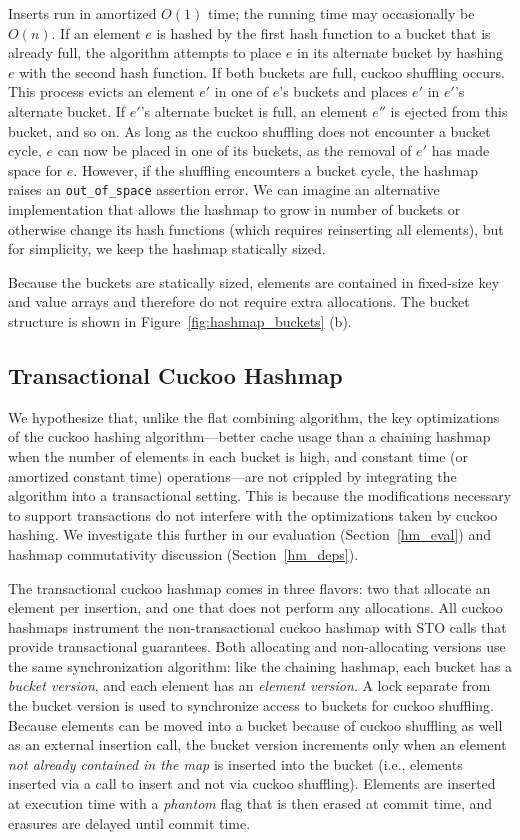 Inserts run in amortized $O(1)$ time; the running time may occasionally be $O(n)$.
If an element $e$ is hashed by the first hash function to a bucket that is already full, the algorithm attempts to place $e$ in its alternate bucket by hashing $e$ with the second hash function. If both buckets are full, cuckoo shuffling occurs. This process evicts an element $e'$ in one of $e$'s buckets and places $e'$ in $e'$'s alternate bucket. If $e'$'s alternate bucket is full, an element $e''$ is ejected from this bucket, and so on. As long as the cuckoo shuffling does not encounter a bucket cycle, $e$ can now be placed in one of its buckets, as the removal of $e'$ has made space for $e$.
However, if the shuffling encounters a bucket cycle, the hashmap raises an \texttt{{out\_of\_space}} assertion error. We can imagine an alternative implementation that allows the hashmap to grow in number of buckets or otherwise change its hash functions (which requires reinserting all elements), but for simplicity, we keep the hashmap statically sized.

Because the buckets are statically sized, elements are contained in fixed-size key and value arrays and therefore do not require extra allocations. The bucket structure is shown in Figure~\ref{fig:hashmap_buckets} (b). 

\subsection{Transactional Cuckoo Hashmap}

We hypothesize that, unlike the flat combining algorithm, the key optimizations of the cuckoo hashing algorithm---better cache usage than a chaining hashmap when the number of elements in each bucket is high, and constant time (or amortized constant time) operations---are not crippled by integrating the algorithm into a transactional setting. This is because the modifications necessary to support transactions do not interfere with the optimizations taken by cuckoo hashing. We investigate this further in our evaluation (Section~\ref{hm_eval}) and hashmap commutativity discussion (Section~\ref{hm_deps}).

The transactional cuckoo hashmap comes in three flavors: two that allocate an element per insertion, and one that does not perform any allocations. All cuckoo hashmaps instrument the non-transactional cuckoo hashmap with STO calls that provide transactional guarantees.
Both allocating and non-allocating versions use the same synchronization algorithm: like the chaining hashmap, each bucket has a \emph{bucket version}, and each element has an \emph{element version}. A lock separate from the bucket version is used to synchronize access to buckets for cuckoo shuffling.
Because elements can be moved into a bucket because of cuckoo shuffling as well as an external insertion call, the bucket version increments only when an element \emph{not already contained in the map} is inserted into the bucket (i.e., elements inserted via a call to insert and not via cuckoo shuffling). Elements are inserted at execution time with a \emph{phantom} flag that is then erased at commit time, and erasures are delayed until commit time.

